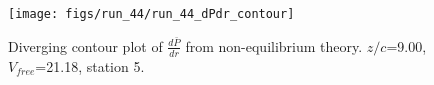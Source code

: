 \begin{figure}[H]
\centering
\texttt{[image: figs/run\_44/run\_44\_dPdr\_contour]}
\caption{Diverging contour plot of $\frac{d\bar{P}}{dr}$ from non-equilibrium theory. $z/c$=9.00, $V_{free}$=21.18, station 5.}
\label{fig:run_44_dPdr_contour}
\end{figure}


